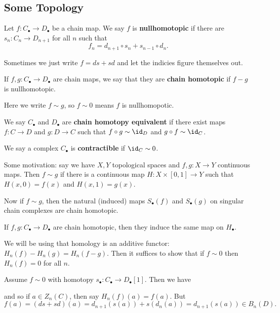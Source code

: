 \documentclass[12pt]{article}
\begin{document}
\subsection{Some Topology}
\begin{defn}
	Let $f:C_\bullet\to D_\bullet$ be a chain map. We say $f$ is \textbf{nullhomotopic} if there are $s_n:C_n\to D_{n+1}$
	for all $n$ such that
	\[f_n=d_{n+1}\circ s_n+s_{n-1}\circ d_n.\]

	Sometimes we just write $f=ds+sd$ and let the indicies figure themselves out.
\end{defn}
\begin{defn}
	If $f,g:C_\bullet\to D_\bullet$ are chain maps, we say that they are \textbf{chain homotopic}
	if $f-g$ is nullhomotopic.

	Here we write $f\sim g$, so $f\sim 0$ means $f$ is nullhomopotic.
\end{defn}
\begin{defn}
	We say $C_\bullet$ and $D_\bullet $ are \textbf{chain homotopy equivalent} if there
	exist maps $f:C\to D$ and $g:D\to C$ such that $f\circ g\sim\id_D$ and $g\circ f\sim \id_C$.
\end{defn}
\begin{defn}
	We say a complex $C_\bullet$ is \textbf{contractible} if $\id_C\sim 0$.
\end{defn}
\begin{rmk}
	Some motivation: say we have $X,Y$ topological spaces and $f,g:X\to Y$ continuous maps. Then $f\sim g$
	if there is a continuous map $H:X\times [0,1]\to Y$ such that $H(x,0)=f(x)$ and $H(x,1)=g(x)$.

	Now if $f\sim g$, then the natural (induced) maps $S_\bullet(f)$ and $ S_\bullet(g)$ on singular 
	chain complexes are chain homotopic.
\end{rmk}
\begin{thm}
	If $f,g:C_\bullet\to D_\bullet$ are chain homotopic, then they induce the same map on $H_\bullet$.
\end{thm}
\begin{prf}
	We will be using that homology is an additive functor: $H_n(f)-H_n(g)=H_n(f-g)$. Then it suffices to show 
	that if $f\sim 0$ then $H_n(f)=0$ for all $n$.

	Assume $f\sim 0$ with homotopy $s_\bullet:C_\bullet\to D_\bullet[1]$. Then we have
	\begin{center}
	\end{center}

	\noindent and so if $a\in Z_n(C)$, then say $H_n(f)(a)=f(a)$. But 
	\[f(a)=(ds+sd)(a)=d_{n+1}(s(a))+s(d_n(a))=d_{n+1}(s(a))\in B_n(D).\]
\end{prf}
\end{document}
